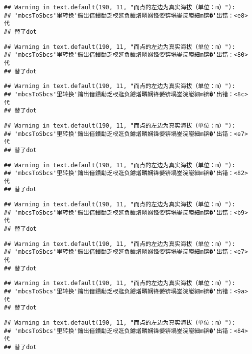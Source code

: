 \documentclass[
]{article}
\begin{document}
\begin{verbatim}
## Warning in text.default(190, 11, "而点的左边为真实海拔（单位：m）"):
## 'mbcsToSbcs'里转换'鑰岀偣鐨勫乏杈逛负鐪熷疄娴锋嫈锛堝崟浣嶏細m锛�'出错：<e8>代
## 替了dot
\end{verbatim}

\begin{verbatim}
## Warning in text.default(190, 11, "而点的左边为真实海拔（单位：m）"):
## 'mbcsToSbcs'里转换'鑰岀偣鐨勫乏杈逛负鐪熷疄娴锋嫈锛堝崟浣嶏細m锛�'出错：<80>代
## 替了dot
\end{verbatim}

\begin{verbatim}
## Warning in text.default(190, 11, "而点的左边为真实海拔（单位：m）"):
## 'mbcsToSbcs'里转换'鑰岀偣鐨勫乏杈逛负鐪熷疄娴锋嫈锛堝崟浣嶏細m锛�'出错：<8c>代
## 替了dot
\end{verbatim}

\begin{verbatim}
## Warning in text.default(190, 11, "而点的左边为真实海拔（单位：m）"):
## 'mbcsToSbcs'里转换'鑰岀偣鐨勫乏杈逛负鐪熷疄娴锋嫈锛堝崟浣嶏細m锛�'出错：<e7>代
## 替了dot
\end{verbatim}

\begin{verbatim}
## Warning in text.default(190, 11, "而点的左边为真实海拔（单位：m）"):
## 'mbcsToSbcs'里转换'鑰岀偣鐨勫乏杈逛负鐪熷疄娴锋嫈锛堝崟浣嶏細m锛�'出错：<82>代
## 替了dot
\end{verbatim}

\begin{verbatim}
## Warning in text.default(190, 11, "而点的左边为真实海拔（单位：m）"):
## 'mbcsToSbcs'里转换'鑰岀偣鐨勫乏杈逛负鐪熷疄娴锋嫈锛堝崟浣嶏細m锛�'出错：<b9>代
## 替了dot
\end{verbatim}

\begin{verbatim}
## Warning in text.default(190, 11, "而点的左边为真实海拔（单位：m）"):
## 'mbcsToSbcs'里转换'鑰岀偣鐨勫乏杈逛负鐪熷疄娴锋嫈锛堝崟浣嶏細m锛�'出错：<e7>代
## 替了dot
\end{verbatim}

\begin{verbatim}
## Warning in text.default(190, 11, "而点的左边为真实海拔（单位：m）"):
## 'mbcsToSbcs'里转换'鑰岀偣鐨勫乏杈逛负鐪熷疄娴锋嫈锛堝崟浣嶏細m锛�'出错：<9a>代
## 替了dot
\end{verbatim}

\begin{verbatim}
## Warning in text.default(190, 11, "而点的左边为真实海拔（单位：m）"):
## 'mbcsToSbcs'里转换'鑰岀偣鐨勫乏杈逛负鐪熷疄娴锋嫈锛堝崟浣嶏細m锛�'出错：<84>代
## 替了dot
\end{verbatim}
\end{document}
